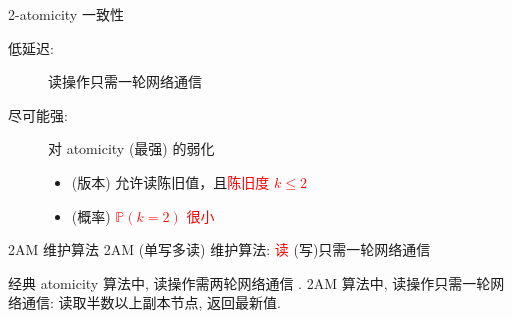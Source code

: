 \begin{frame}{2-atomicity 一致性}

  \begin{center}
  \end{center}

  \begin{cdefinition}
    \begin{description}
      \item[低延迟:] 读操作只需一轮网络通信
      \item[尽可能强:] 对 atomicity (最强) 的弱化
    \begin{itemize}
      \item (版本) 允许读陈旧值，且\textcolor{red}{陈旧度 $k \le 2$}
      \item (概率) \textcolor{red}{$\mathbb{P}(k = 2)$ 很小}
    \end{itemize}
    \end{description}
  \end{cdefinition}
\end{frame}


\begin{frame}{2AM 维护算法}
  2AM (单写多读) 维护算法: \textcolor{red}{读} (写)只需一轮网络通信

  {经典 atomicity 算法中, 读操作需两轮网络通信  
  . 2AM 算法中, 读操作只需一轮网络通信: 
读取半数以上副本节点, 返回最新值.}
\end{frame}


